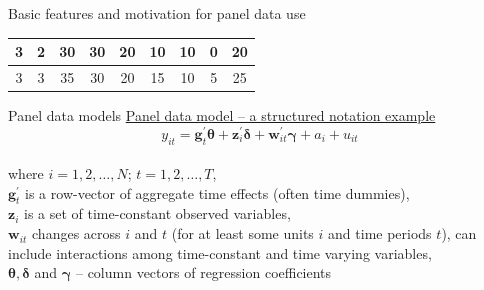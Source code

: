 \documentclass[usenames,dvipsnames]{beamer}
\begin{document}
\begin{frame}{Basic features and motivation for panel data use}
\begin{table}[]
{\begin{tabular}{|c|c|c|c|c|c|c|c|c|}
3   & 2    & 30       & 30                                                        & 20                                                     & 10                                                          & 10                                                          & 0                                                          & 20                                                                      \\ \hline
3   & 3    & 35       & 30                                                        & 20                                                     & 15                                                          & 10                                                          & 5                                                          & 25                                                                      \\ \hline
\end{tabular}}
\end{table}
\end{frame}
\begin{frame}{Panel data models}
\underline{Panel data model -- a structured notation example} \\
\medskip
$$y_{it} = \bm{g}_t^{\prime} \bm{\theta} + \bm{z}_i^{\prime} \bm{\delta} + \bm{w}_{it}^{\prime} \bm{\gamma} + a_i + u_{it}$$\\
\medskip
where \quad $i = 1,2, \dots, N$; $t = 1, 2, \dots, T$, \\
\medskip
$\bm{g}_t^{\prime}$ is a row-vector of aggregate time effects (often time dummies),\\
\medskip
$\bm{z}_i$ is a set of time-constant observed variables, \\
\medskip
$\bm{w}_{it}$ changes across $i$ and $t$ (for at least some units $i$ and time periods $t$), can include interactions among time-constant and time varying variables, \\
\medskip
$\bm{\theta, \delta}$ and $\bm{\gamma}$ -- column vectors of regression coefficients 
\end{frame}
\end{document}
